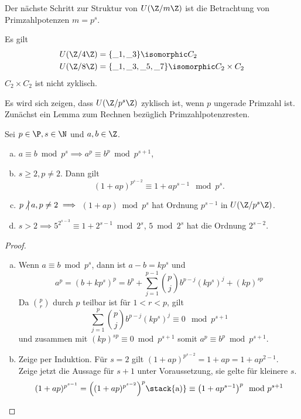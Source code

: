 Der nächste Schritt zur Struktur von $U(\Z / m \Z)$ ist die Betrachtung von Primzahlpotenzen $m = p^s$.

\begin{ex*}
	Es gilt
	\begin{align*}
		U(\Z / 4 \Z) &= \{ \_ 1, \_ 3 \} \isomorphic C_2 \\
		U(\Z / 8 \Z) &= \{ \_ 1, \_ 3, \_ 5, \_ 7 \} \isomorphic C_2 \times C_2
	\end{align*}
	$C_2 \times C_2$ ist nicht zyklisch.
\end{ex*}

Es wird sich zeigen, dass $U(\Z / p^s \Z)$ zyklisch ist, wenn $p$ ungerade Primzahl ist.
Zunächst ein Lemma zum Rechnen bezüglich Primzahlpotenzresten.

\begin{lem} \label{2.7}
	Sei $p \in \P, s \in \N$ und $a, b \in \Z$.
	\begin{enumerate}[a)]
		\item
			$a \equiv b \bmod p^s \implies a^p \equiv b^p \bmod p^{s+1}$,
		\item
			$s \ge 2, p\neq 2$.
			Dann gilt
			\[
				(1 + ap)^{p^{s-2}}
				\equiv 1 + ap^{s-1} \mod p^s.
			\]
		\item
			$p \ndivs a, p \neq 2 \implies $ $(1+ap) \bmod p^s$ hat Ordnung $p^{s-1}$ in $U(\Z / p^s \Z)$.
		\item
			$s > 2 \implies 5^{2^{s-3}} \equiv 1 + 2^{s-1} \bmod 2^s$, $5 \bmod 2^s$ hat die Ordnung $2^{s-2}$.
	\end{enumerate}
	\begin{proof}
		\begin{enumerate}[a)]
			\item
				Wenn $a \equiv b \bmod p^s$, dann ist $a - b = k p^s$ und
				\[
					a^p
					= (b + kp^s)^p
					= b^p + \sum_{j=1}^{p-1} \binom{p}{j} b^{p-j} (kp^s)^j + (kp)^{sp}
				\]
				Da $\binom{p}{r}$ durch $p$ teilbar ist für $1 < r < p$, gilt
				\[
					\sum_{j=1}^p \binom{p}{j} b^{p-j} (kp^s)^j \equiv 0 \mod p^{s+1}
				\]
				und zusammen mit $(kp)^{sp} \equiv 0 \bmod p^{s+1}$ somit $a^p \equiv b^p \bmod p^{s+1}$.
			\item
{}
				Zeige per Induktion.
				Für $s = 2$ gilt $(1 + ap)^{p^{s-2}} = 1 + ap = 1 + ap^{2-1}$.
				Zeige jetzt die Aussage für $s + 1$ unter Voraussetzung, sie gelte für kleinere $s$.
				\[
					(1 + ap)^{p^{s-1}}
					= \Big((1 + ap)^{p^{s-2}}\Big)^p
					\stack{\text{a)}}\equiv \big(1 + ap^{s-1} \big)^p \mod p^{s+1}
				\]

\end{enumerate}
\end{proof}
\end{lem}
